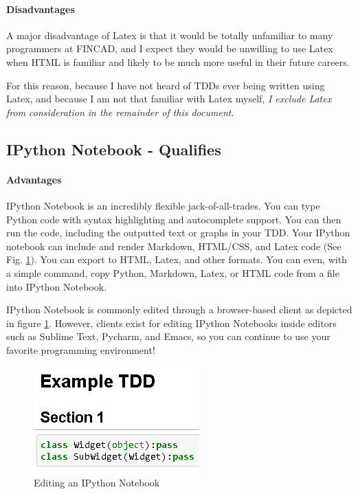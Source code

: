 \documentclass[12pt]{Report}
\begin{document}
	\paragraph{Disadvantages}	
	A major disadvantage of Latex is that it would be totally unfamiliar to many programmers at FINCAD, 
	and I expect they would be unwilling to use Latex when HTML is familiar and likely to be much more useful in their future careers.
	
	For this reason, because I have not heard of TDDs ever being written using Latex, and because I am not that familiar with Latex myself, 
	\emph{I exclude Latex from consideration in the remainder of this document}.


\subsection{IPython Notebook - Qualifies}
	\paragraph{Advantages}
		IPython Notebook is an incredibly flexible jack-of-all-trades.  
		You can type Python code with syntax highlighting and autocomplete support. 
		You can then run the code, including the outputted text or graphs in your TDD.  
		Your IPython notebook can include and render Markdown, HTML/CSS, and Latex code (See Fig. \ref{IPython}).  
		You can export to HTML, Latex, and other formats.  
		You can even, with a simple command, copy Python, Markdown, Latex, or HTML code from a file into IPython Notebook.
		
		IPython Notebook is commonly edited through a browser-based client as depicted in figure \ref{IPython}.  However, clients exist for editing IPython Notebooks inside editors such as Sublime Text, Pycharm, and Emacs, so you can continue to use your favorite programming environment!
		
		\begin{figure}[h]
			\centering
			\includegraphics[scale=.75]{IPython_Notebook.PNG}
			\caption{Editing an IPython Notebook}
			\label{IPython}
		\end{figure}
		
\end{document}
